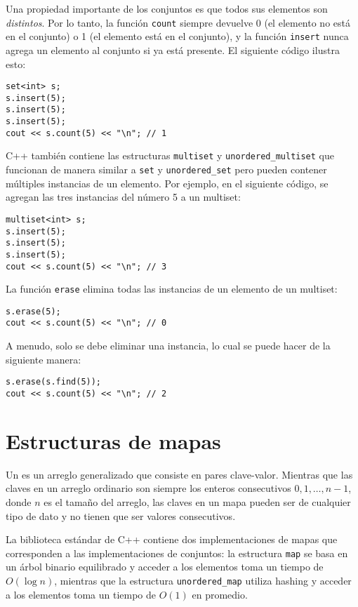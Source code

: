 Una propiedad importante de los conjuntos es
que todos sus elementos son \emph{distintos}.
Por lo tanto, la función \texttt{count} siempre devuelve
0 (el elemento no está en el conjunto)
o 1 (el elemento está en el conjunto),
y la función \texttt{insert} nunca agrega
un elemento al conjunto si ya está
presente.
El siguiente código ilustra esto:

\begin{lstlisting}
set<int> s;
s.insert(5);
s.insert(5);
s.insert(5);
cout << s.count(5) << "\n"; // 1
\end{lstlisting}

C++ también contiene las estructuras
\texttt{multiset} y \texttt{unordered\_multiset}
que funcionan de manera similar a \texttt{set}
y \texttt{unordered\_set}
pero pueden contener múltiples instancias de un elemento.
Por ejemplo, en el siguiente código, se agregan las tres instancias
del número 5 a un multiset:

\begin{lstlisting}
multiset<int> s;
s.insert(5);
s.insert(5);
s.insert(5);
cout << s.count(5) << "\n"; // 3
\end{lstlisting}
La función \texttt{erase} elimina
todas las instancias de un elemento
de un multiset:
\begin{lstlisting}
s.erase(5);
cout << s.count(5) << "\n"; // 0
\end{lstlisting}
A menudo, solo se debe eliminar una instancia,
lo cual se puede hacer de la siguiente manera:
\begin{lstlisting}
s.erase(s.find(5));
cout << s.count(5) << "\n"; // 2
\end{lstlisting}

\section{Estructuras de mapas}


Un  es un arreglo generalizado
que consiste en pares clave-valor.
Mientras que las claves en un arreglo ordinario son siempre
los enteros consecutivos $0,1,\ldots,n-1$,
donde $n$ es el tamaño del arreglo,
las claves en un mapa pueden ser de cualquier tipo de dato y
no tienen que ser valores consecutivos.

La biblioteca estándar de C++ contiene dos implementaciones de mapas
que corresponden a las implementaciones de conjuntos: la estructura
\texttt{map} se basa en un árbol binario equilibrado y acceder a los elementos
toma un tiempo de $O(\log n)$,
mientras que la estructura
\texttt{unordered\_map} utiliza hashing
y acceder a los elementos toma un tiempo de $O(1)$ en promedio.

